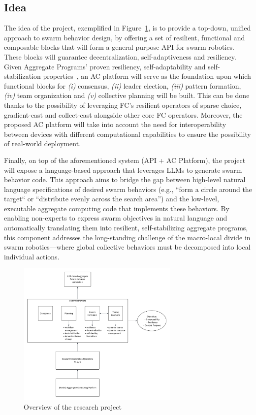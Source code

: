 \documentclass[12pt]{article}
\begin{document}
\subsection{Idea}
The idea of the project, exemplified in Figure~\ref{fig:research-project}, is to provide a top-down, unified approach to swarm behavior design, by offering a
set of resilient, functional and composable blocks that will form a general purpose API for swarm robotics. These blocks will guarantee decentralization, self-adaptiveness and resiliency.
Given Aggregate Programs' proven resiliency, self-adaptability and self-stabilization properties~\cite{viroli2018engineering}, an AC platform will serve as the
foundation upon which functional blocks for \textit{(i)} consensus, \textit{(ii)} leader election, \textit{(iii)} pattern formation,
\textit{(iv)} team organization and \textit{(v)} collective planning will be built. This can be done thanks to the possibility of leveraging FC's resilient operators of sparse choice, 
gradient-cast and collect-cast alongside other core FC operators. Moreover, the proposed AC platform will take into account the need for interoperability between devices with different 
computational capabilities to ensure the possibility of real-world deployment.

Finally, on top of the aforementioned system (API + AC Platform), the project will expose a language-based approach that leverages LLMs to generate swarm behavior code. This approach aims to bridge the gap between high-level natural language specifications of desired swarm behaviors (e.g., ``form a circle around the target`` or ``distribute evenly across the search area'') and the low-level, executable aggregate computing code that implements these behaviors. By enabling non-experts to express swarm objectives in natural language and automatically translating them into resilient, self-stabilizing aggregate programs, this component addresses the long-standing challenge of the macro-local divide in swarm robotics---where global collective behaviors must be decomposed into local individual actions.

\begin{figure}
	\centering
	\includegraphics[width=0.7\textwidth]{figures/ResearchProject.png}
	\caption{Overview of the research project}
	 \label{fig:research-project}
\end{figure}
\end{document}
